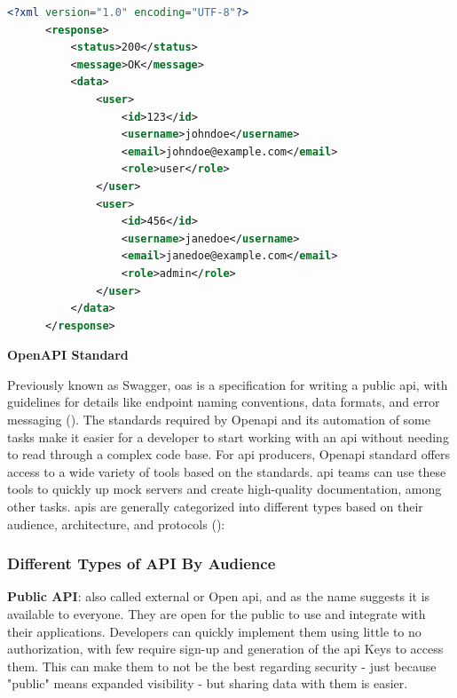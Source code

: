 \begin{lstlisting}[language=XML, caption=Example of a XML response, label=lst:xmlresponse]
      <?xml version="1.0" encoding="UTF-8"?>
      <response>
          <status>200</status>
          <message>OK</message>
          <data>
              <user>
                  <id>123</id>
                  <username>johndoe</username>
                  <email>johndoe@example.com</email>
                  <role>user</role>
              </user>
              <user>
                  <id>456</id>
                  <username>janedoe</username>
                  <email>janedoe@example.com</email>
                  <role>admin</role>
              </user>
          </data>
      </response>
\end{lstlisting}

\begin{multicols}{2}
      \textbf{OpenAPI Standard}

      Previously known as Swagger, \acrshort{oas} is a specification for writing a public \acrshort{api}, with
      guidelines for details like endpoint naming conventions, data formats, and error messaging
      (\cite{openapistandard}). The standards required by Open\acrshort{api} and its automation of some tasks
      make it easier for a developer to start working with an \acrshort{api} without needing to read through
      a complex code base. For \acrshort{api} producers, Open\acrshort{api} standard offers access to a wide
      variety of tools based on the standards. \acrshort{api} teams can use these tools to quickly up mock
      servers and create high-quality documentation, among other tasks.
      \acrshort{api}s are generally categorized into different types based on their audience, architecture, and
      protocols (\cite{typesofapi}):
      \subsubsection{Different Types of API By Audience}
      \textbf{Public API}: also called external or Open \acrshort{api}, and as the name suggests it is available
      to everyone. They are open for the public to use and integrate with their applications. Developers can quickly
      implement them using little to no authorization, with few require sign-up and generation of the \acrshort{api} Keys
      to access them. This can make them to not be the best regarding security - just because "public" means expanded
      visibility - but sharing data with them is easier.


\end{multicols}
